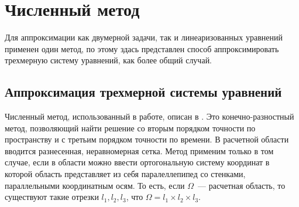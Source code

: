 \section*{Численный метод}

Для аппроксимации как двумерной задачи, так и линеаризованных уравнений применен один метод\cite{method}, по этому здась представлен способ аппроксимировать трехмерную систему уравнений, как более общий случай.

\subsection*{Аппроксимация трехмерной системы уравнений}

Численный метод, использованный в работе, описан в \cite{method}. Это конечно-разностный метод, позволяющий найти решение со вторым порядком точности по пространству и с третьим порядком точности по времени. В расчетной области вводится разнесенная, неравномерная сетка. Метод применим только в том случае, если в области можно ввести ортогональную систему координат в которой область представляет из себя паралеллепипед со стенками, параллельными координатным осям. То есть, если $\Omega$~--- расчетная область, то существуют такие отрезки $l_1, l_2, l_3$, что $\Omega = l_1 \times l_2 \times l_3$. 

